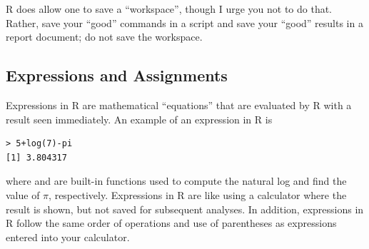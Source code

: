 \documentclass[10pt,openany]{book}\usepackage[]{graphicx}\usepackage[]{color}
\makeatletter
\newenvironment{kframe}{%
 \def\at@end@of@kframe{}%
 \ifinner\ifhmode%
  \def\at@end@of@kframe{\end{minipage}}%
  \begin{minipage}{\columnwidth}%
 \fi\fi%
 \def\FrameCommand##1{\hskip\@totalleftmargin \hskip-\fboxsep
 \colorbox{shadecolor}{##1}\hskip-\fboxsep
     \hskip-\linewidth \hskip-\@totalleftmargin \hskip\columnwidth}%
 \MakeFramed {\advance\hsize-\width
   \@totalleftmargin\z@ \linewidth\hsize
   \@setminipage}}%
 {\par\unskip\endMakeFramed%
 \at@end@of@kframe}
\newenvironment{knitrout}{}{} %
\makeatother
\begin{document}
R does allow one to save a ``workspace'', though I urge you not to do that.  Rather, save your ``good'' commands in a script and save your ``good'' results in a report document; do not save the workspace.


\vspace{-8pt}
\subsection{Expressions and Assignments} \label{sect:RExprAssn}
\vspace{-8pt}
Expressions in R are mathematical ``equations'' that are evaluated by R with a result seen immediately.  An example of an expression in R is
\begin{knitrout}
\color{fgcolor}\begin{kframe}
\begin{verbatim}
> 5+log(7)-pi
[1] 3.804317
\end{verbatim}
\end{kframe}
\end{knitrout}

where  and  are built-in functions used to compute the natural log and find the value of $\pi$, respectively.  Expressions in R are like using a calculator where the result is shown, but not saved for subsequent analyses.  In addition, expressions in R follow the same order of operations and use of parentheses as expressions entered into your calculator.

\end{document}
